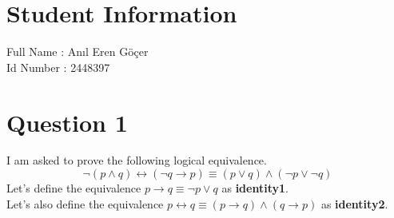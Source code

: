 \documentclass[11pt]{article}
\begin{document}
\section*{Student Information } 
Full Name : Anıl Eren Göçer\\
Id Number : 2448397 \\

\section*{Question 1}
I am asked to prove the following logical equivalence.
\begin{equation*}
    \neg(p \wedge q) \leftrightarrow (\neg q \rightarrow p) \equiv (p \vee q) \wedge (\neg p \vee \neg q) 
\end{equation*}
Let's define the equivalence $ p \to q \equiv \neg p \vee q $ as \textbf{identity1}. \\
Let's also define the equivalence $ p \leftrightarrow q \equiv (p\to q) \wedge (q \to p) $ as \textbf{identity2}.
\end{document}
